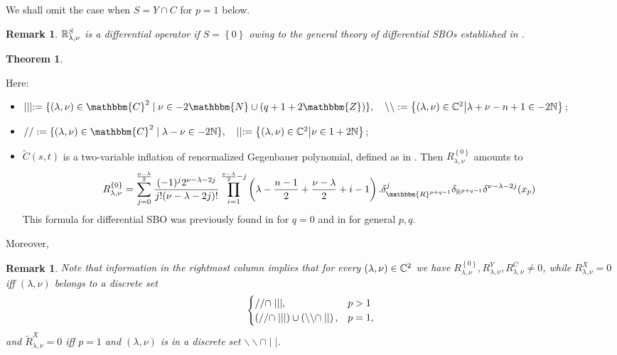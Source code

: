 \documentclass[12pt]{article} %
\newcommand{\assign}{:=}
\newtheorem{remark}[theorem]{Remark}
\theoremstyle{definition}
\theoremstyle{exampstyle} \newtheorem{examp}[theorem]{Theorem}
\begin{document}
We shall omit the case when $S=Y\cap C$ for $p=1$ below.
\begin{remark}
	$\mathbb{R}_{\lambda,\nu}^S$ is a differential operator if $S=\left\{ 0 \right\}$ owing to the general theory of differential SBOs established in \cite[Chap. 2]{kobayashi2016differential1}.
\end{remark}
\hspace{-2cm}\begin{examp}\noindent\hspace*{-2cm}\\

\hspace*{-3.5cm}Here:
\begin{itemize}
	\item $\mid \mid \mid \assign \{ (\lambda, \nu) \in \mathbbm{C}^2 \mid \nu \in
	- 2\mathbbm{N} \cup (q + 1 + 2\mathbbm{Z}) \},\quad \backslash\backslash:=\mysetn{(\lambda,\nu)\in\C^2}{\lambda+\nu-n+1\in-2\N}$;
\item $/ / \assign
\{ (\lambda, \nu) \in \mathbbm{C}^2 \mid \lambda - \nu \in
-2\N \},\quad \mid\mid:=\mysetn{(\lambda,\nu)\in\C^2}{\nu\in1+2\N}$;
\item $\tilde{C}(s,t)$ is a two-variable inflation of renormalized Gegenbauer polynomial, defined as in \cite[(16.3)]{kobayashi2015symmetry}.
	Then $R_{\lambda,\nu}^{ \left\{ 0 \right\}}$ amounts to
	\begin{equation*}
		R_{\lambda,\nu}^{ \left\{ 0 \right\}}=
		\sum_{j=0}^{\frac{\nu-\lambda}{2}}\frac{(-1)^j2^{\nu-\lambda-2j}}{j!(\nu-\lambda-2j)!}\prod_{i=1}^{\frac{\nu-\lambda}{2}-j}\left( \lambda-\frac{n-1}{2}+\frac{\nu-\lambda}{2}
		+i-1 \right).\delta^j_{\mathbbm{R}^{p + q - 1}}\delta_{\R^{p+q-1}} \delta^{\nu-\lambda-2j}(x_p)
	\end{equation*}
	This formula for differential SBO was previously found in \cite{juhl2009families,kobayashi2015symmetry} for $q=0$ and in \cite{kobayashi2015branching} for general $p,q$.
\end{itemize}
Moreover,\\
\end{examp}
\begin{remark}
	Note that information in the rightmost column implies that for every $(\lambda,\nu)\in\mathbb{C}^2$ we have $R_{\lambda,\nu}^{ \left\{ 0 \right\}},R_{\lambda,\nu}^Y,R_{\lambda,\nu}^C\neq0$, while
	$R^X_{\lambda,\nu}=0$ iff $(\lambda,\nu)$ belongs to a discrete set
	\[\begin{cases}
			//\cap\mid\mid\mid,&p>1\\
			\left(//\cap\mid\mid\mid\right) \cup \left(\backslash\backslash\cap\mid\mid\right),&p=1,
		\end{cases}
	\]
	and $\tilde{R}_{\lambda,\nu}^X=0$ iff $p=1$ and $(\lambda,\nu)$ is in a discrete set $\backslash\backslash\cap \mid\mid$.
\end{remark}
\end{document}
